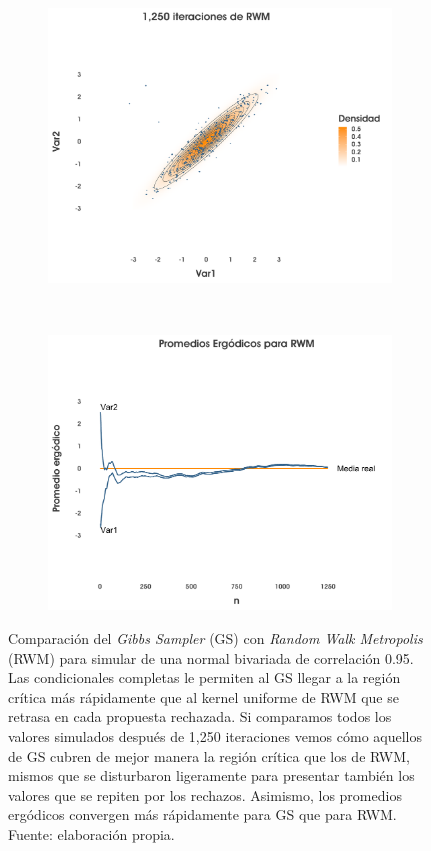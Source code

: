 \begin{figure}[h]
\begin{subfigure}{0.3\textwidth}
        \includegraphics[width=\textwidth]{Figs/Bayes/Ejemplo_RWM_Compara2B}
    \end{subfigure}
    ~
    \begin{subfigure}{0.3\textwidth}
        \includegraphics[width=\textwidth]{Figs/Bayes/Ejemplo_RWM_Compara2C}
    \end{subfigure}
    \caption{Comparación del \textit{Gibbs Sampler} (GS) con \textit{Random Walk Metropolis} (RWM) para simular de una normal bivariada de correlación 0.95. Las condicionales completas le permiten al GS llegar a la región crítica más rápidamente que al kernel uniforme de RWM que se retrasa en cada propuesta rechazada. Si comparamos todos los valores simulados después de 1,250 iteraciones vemos cómo aquellos de GS cubren de mejor manera la región crítica que los de RWM, mismos que se disturbaron ligeramente para presentar también los valores que se repiten por los rechazos. Asimismo, los promedios ergódicos convergen más rápidamente para GS que para RWM. Fuente: elaboración propia.}\label{fig:GS_corr}
\end{figure}

